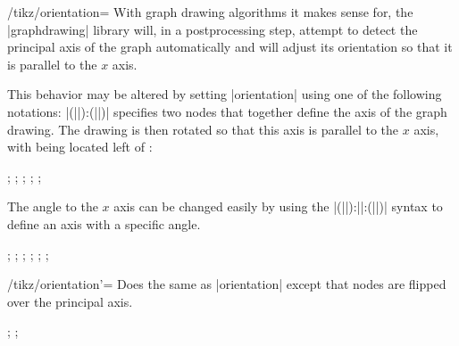 \begin{key}{/tikz/orientation=}
  With graph drawing algorithms it makes sense for, the |graphdrawing|
  library will, in a postprocessing step, attempt to detect the 
  principal axis of the graph automatically and will adjust its 
  orientation so that it is parallel to the $x$ axis.

  This behavior may be altered by setting |orientation| using one of
  the following notations:
  |(||):(||)| specifies
  two nodes that together define the axis of the graph drawing. The
  drawing is then rotated so that this axis is parallel to the $x$
  axis, with  being located left of :
  \begin{codeexample}[]
\tikz {};
\tikz {};
\tikz {};
\tikz {};
\tikz {};
  \end{codeexample}
  The angle to the $x$ axis can be changed easily by using the
  |(||):||:(||)|
  syntax to define an axis with a specific angle.
  \begin{codeexample}[]
\tikz {};
\tikz {};
\tikz {};
\tikz {};
\tikz {};
\tikz {};
  \end{codeexample}
\end{key}

\begin{key}{/tikz/orientation'=}
  Does the same as |orientation| except that nodes are flipped over the
  principal axis.
  \begin{codeexample}[]
\tikz {};
\tikz {};
  \end{codeexample}
\end{key}

